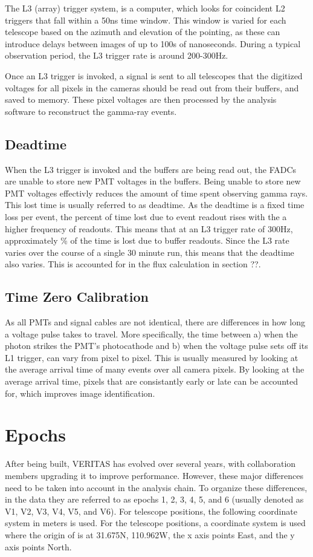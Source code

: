 The L3 (array) trigger system, is a computer, which looks for coincident L2 triggers that fall within a \nicetilde50ns time window.
This window is varied for each telescope based on the azimuth and elevation of the pointing, as these can introduce delays between images of up to 100s of nanoseconds.
During a typical observation period, the L3 trigger rate is around 200-300Hz.

Once an L3 trigger is invoked, a signal is sent to all telescopes that the digitized voltages for all pixels in the cameras should be read out from their buffers, and saved to memory.
These pixel voltages are then processed by the analysis software to reconstruct the gamma-ray events.



\subsection{Deadtime}
When the L3 trigger is invoked and the buffers are being read out, the FADCs are unable to store new PMT voltages in the buffers.
Being unable to store new PMT voltages effectivly reduces the amount of time spent observing gamma rays.
This lost time is usually referred to as deadtime.
As the deadtime is a fixed time loss per event, the percent of time lost due to event readout rises with the a higher frequency of readouts.
This means that at an L3 trigger rate of \nicetilde300Hz, approximately \% of the time is lost due to buffer readouts.
Since the L3 rate varies over the course of a single 30 minute run, this means that the deadtime also varies.
This is accounted for in the flux calculation in {\color{red}section ??}.

\subsection{Time Zero Calibration}
As all PMTs and signal cables are not identical, there are differences in how long a voltage pulse takes to travel.
More specifically, the time between a) when the photon strikes the PMT's photocathode and b) when the voltage pulse sets off its L1 trigger, can vary from pixel to pixel.
This is usually measured by looking at the average arrival time of many events over all camera pixels.
By looking at the average arrival time, pixels that are consistantly early or late can be accounted for, which improves image identification.

\section{Epochs}\label{sec:epochs}
After being built, VERITAS has evolved over several years, with collaboration members upgrading it to improve performance.
However, these major differences need to be taken into account in the analysis chain.
To organize these differences, in the data they are referred to as epochs 1, 2, 3, 4, 5, and 6 (usually denoted as V1, V2, V3, V4, V5, and V6).
For telescope positions, the following coordinate system in meters is used.
For the telescope positions, a coordinate system is used where the origin of is at 31.675N, 110.962W, the x axis points East, and the y axis points North.

